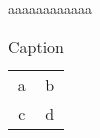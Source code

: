 \documentclass{article}
\begin{document}




aaaaaaaaaaaa

\begin{table}[]
    \centering
    \begin{tabular}{c|c}
        a & b \\
        c & d
    \end{tabular}
    \caption{Caption}
    \label{tab:my_label}
\end{table}

\ThesesVSPublications


\end{document}
